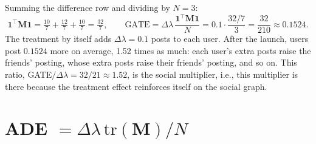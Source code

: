 \documentclass[11pt]{article}
\newcommand{\one}{\mathbf{1}}
\newcommand{\mM}{\mathbf{M}}
\begin{document}
Summing the difference row and dividing by $N = 3$:
\[
\one^\top \mM \one = \tfrac{10}{7} + \tfrac{12}{7} + \tfrac{10}{7} = \tfrac{32}{7},
\qquad
\text{GATE} = \Delta\lambda\,\frac{\one^\top \mM\one}{N} = 0.1\cdot\frac{32/7}{3} = \frac{32}{210} \approx 0.1524 .
\]
The treatment by itself adds $\Delta\lambda = 0.1$ posts to each user.  After the launch, users post $0.1524$ more on average, 1.52 times as much: each user's extra posts raise the friends' posting, whose extra posts raise their friends' posting, and so on.  This ratio, GATE$/\Delta\lambda = 32/21 \approx 1.52$, is the social multiplier, i.e., this multiplier is there because the treatment effect reinforces itself on the social graph.

\section{ADE $= \Delta\lambda\, \mathrm{tr}(\mM) / N$}
\end{document}
